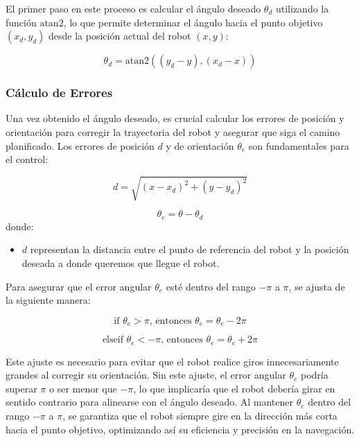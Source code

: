 \documentclass[conference]{IEEEtran}
\begin{document}
El primer paso en este proceso es calcular el ángulo deseado \(\theta_d\) utilizando la función \( \text{atan2} \), lo que permite determinar el ángulo hacia el punto objetivo \((x_d, y_d)\) desde la posición actual del robot \((x, y)\):

\begin{equation}
\theta_d = \text{atan2}((y_d-y),(x_d-x))
\end{equation}


\subsubsection{Cálculo de Errores}

Una vez obtenido el ángulo deseado, es crucial calcular los errores de posición y orientación para corregir la trayectoria del robot y asegurar que siga el camino planificado. Los errores de posición \(d\) y de orientación \(\theta_e\) son fundamentales para el control:

\begin{equation}
d = \sqrt{(x-x_d)^2 + (y-y_d)^2}
\end{equation}

\begin{equation}
\theta_e = \theta - \theta_d
\end{equation}
donde:
\begin{itemize}
    \item \( {d} \) representan la distancia entre el punto de referencia del robot y la posición deseada a donde queremos que llegue el robot.
    \end{itemize}

Para asegurar que el error angular \(\theta_e\) esté dentro del rango \(-\pi\) a \(\pi\), se ajusta de la siguiente manera:

\begin{equation}
\text{if } \theta_e > \pi \text{, entonces } \theta_e = \theta_e - 2\pi
\end{equation}

\begin{equation}
\text{elseif } \theta_e < -\pi \text{, entonces } \theta_e = \theta_e + 2\pi
\end{equation}

Este ajuste es necesario para evitar que el robot realice giros innecesariamente grandes al corregir su orientación. Sin este ajuste, el error angular \(\theta_e\) podría superar \(\pi\) o ser menor que \(-\pi\), lo que implicaría que el robot debería girar en sentido contrario para alinearse con el ángulo deseado. Al mantener \(\theta_e\) dentro del rango \(-\pi\) a \(\pi\), se garantiza que el robot siempre gire en la dirección más corta hacia el punto objetivo, optimizando así su eficiencia y precisión en la navegación.
\end{document}
